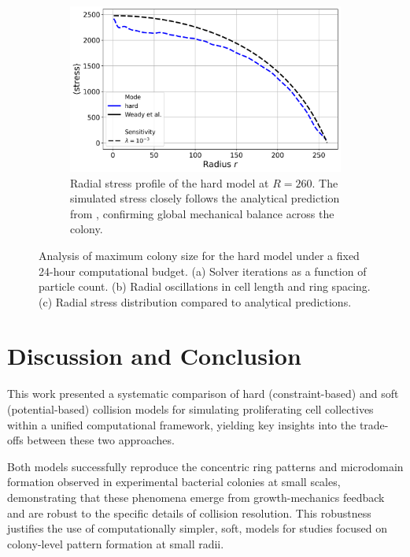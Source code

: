 \documentclass[conference]{IEEEtran}
\begin{document}
\begin{figure}[H]
    \begin{subfigure}[b]{\linewidth}
        \centering
        \includegraphics[width=\linewidth]{figures/huge/huge_combined_stress_shared.png}
        \caption{Radial stress profile of the hard model at $R = 260$. The simulated stress closely follows the analytical prediction from \cite{Weady2024SM}, confirming global mechanical balance across the colony.}
        \label{fig:huge_combined_stress_shared}
    \end{subfigure}

    \caption{Analysis of maximum colony size for the hard model under a fixed 24-hour computational budget. (a) Solver iterations as a function of particle count. (b) Radial oscillations in cell length and ring spacing. (c) Radial stress distribution compared to analytical predictions.}
    \label{fig:huge_colony_scaling}
\end{figure}

\clearpage
\newpage

\section{Discussion and Conclusion}

This work presented a systematic comparison of hard (constraint-based) and soft (potential-based) collision models for simulating proliferating cell collectives within a unified computational framework, yielding key insights into the trade-offs between these two approaches.

Both models successfully reproduce the concentric ring patterns and microdomain formation observed in experimental bacterial colonies at small scales, demonstrating that these phenomena emerge from growth-mechanics feedback and are robust to the specific details of collision resolution. This robustness justifies the use of computationally simpler, soft, models for studies focused on colony-level pattern formation at small radii.
\end{document}
